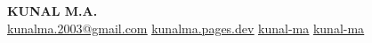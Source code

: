 \begin{center}
    \textbf{\Huge \scshape KUNAL M.A.} \\ \vspace{10pt}
    \small
    \href{mailto:kunalma.2003@gmail.com}{ \underline{kunalma.2003@gmail.com}} \quad
    \href{https://kunalma.pages.dev}{ \underline{kunalma.pages.dev}} \quad
    \href{https://www.linkedin.com/in/kunal-ma}{ \underline{kunal-ma}} \quad
    \href{https://github.com/kunal-ma}{ \underline{kunal-ma}} \\ \vspace{3pt}
\end{center}